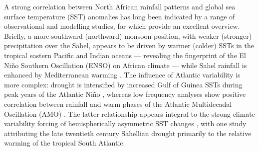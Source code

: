 \documentclass[a4paper]{article}
\begin{document}
A strong correlation between North African rainfall patterns and global sea surface temperature (SST) anomalies has long been indicated by a range of observational and modelling studies, for which \citeauthor{rodriguez2015variability} \parencite{rodriguez2015variability} provide an excellent overview.
Briefly, a more southward (northward) monsoon position, with weaker (stronger) precipitation over the Sahel, appears to be driven by warmer (colder) SSTs in the tropical eastern Pacific \parencite{rowell1995variability, fontaine1996sea, rowell2001teleconnections, janicot2001summer, giannini2003oceanic} and Indian \parencite{rowell1995variability, fontaine1996sea, bader2003impact, giannini2003oceanic} oceans --- revealing the fingerprint of the El Ni\~{n}o Southern Oscillation (ENSO) on African climate \parencite{janowiak1988investigation, rowell1995variability, ward1998diagnosis} --- while Sahel rainfall is enhanced by Mediterranean warming \parencite{rowell2003impact, gaetani2010influence, fontaine2010impacts}.
The influence of Atlantic variability is more complex: drought is intensified by increased Gulf of Guinea SSTs during peak years of the Atlantic Ni\~{n}o \parencite{lamb1978case, bah1987towards, rowell1995variability, fontaine1996sea, ward1998diagnosis, giannini2003oceanic}, whereas low frequency analyses show positive correlation between rainfall and warm phases of the Atlantic Multidecadal Oscillation (AMO) \parencite{zhang2006impact, martin2014impact}.
The latter relationship appears integral to the strong climate variability forcing of hemispherically asymmetric SST changes \parencite{folland1986sahel, lamb1978large, rowell1995variability, fontaine1998evolution, ward1998diagnosis}, with one study \parencite{hoerling2006detection} attributing the late twentieth century Sahellian drought primarily to the relative warming of the tropical South Atlantic. 
\end{document}
